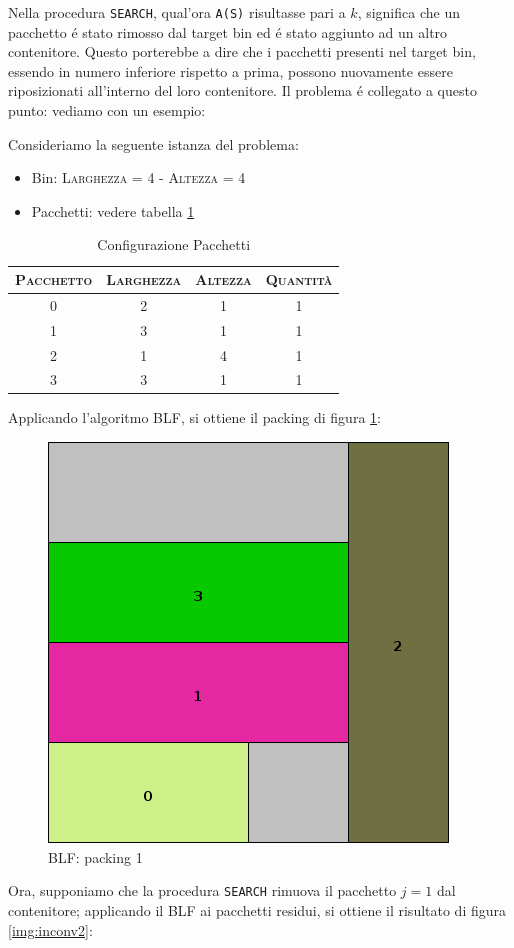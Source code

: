 Nella procedura \texttt{SEARCH}, qual'ora \texttt{A(S)} risultasse pari a $k$, significa che un pacchetto é stato rimosso dal target bin ed é stato aggiunto ad un altro contenitore. Questo porterebbe a dire che i pacchetti presenti nel target bin, essendo in numero inferiore rispetto a prima, possono nuovamente essere riposizionati all'interno del loro contenitore. Il problema é collegato a questo punto: vediamo con un esempio:

Consideriamo la seguente istanza del problema:
\begin{itemize}[noitemsep]
   \item Bin: \textsc{Larghezza = 4} - \textsc{Altezza = 4}
   \item Pacchetti: vedere tabella \ref{table:packets}
\end{itemize}
\begin{table}[htp]
  \small\centering
  \begin{tabular}{c|ccc}
    \toprule
    \textsc{Pacchetto} & \textsc{Larghezza} & \textsc{Altezza} & \textsc{Quantità}\\
    \midrule
    0 & 2 & 1 & 1\\
    1 & 3 & 1 & 1\\
    2 & 1 & 4 & 1\\
    3 & 3 & 1 & 1\\
    \bottomrule
  \end{tabular}
  \caption{Configurazione Pacchetti}
  \label{table:packets}
\end{table}

Applicando l'algoritmo BLF, si ottiene il packing di figura \ref{img:inconv1}:

\begin{figure}[h!]
  \centering
  \includegraphics[height=0.3\textwidth]{./img/inconv1.png}
  \caption{BLF: packing 1}
  \label{img:inconv1}
\end{figure}

Ora, supponiamo che la procedura \texttt{SEARCH} rimuova il pacchetto $j=1$ dal contenitore; applicando il BLF ai pacchetti residui, si ottiene il risultato di figura \ref{img:inconv2}:

